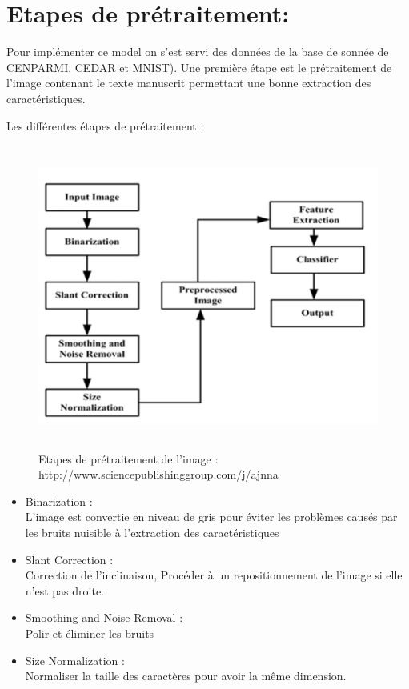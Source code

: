\documentclass[12pt, letterpaper]{article}
\begin{document}
\section{Etapes de prétraitement:} 
\par Pour implémenter ce model on s’est servi des données de la base de sonnée de CENPARMI, CEDAR et MNIST). Une première étape est le prétraitement de l’image contenant le texte manuscrit permettant une bonne extraction des caractéristiques. \\
\par Les différentes étapes de prétraitement :
\begin{figure}[H]
    \includegraphics[width=12cm,height=10cm]{images/pretraitement.png}
    \caption{Etapes de prétraitement de l’image : http://www.sciencepublishinggroup.com/j/ajnna}
    \label{fig:L1}
\end{figure}
\begin{itemize}
		\item Binarization :\\
		L’image est convertie en niveau de gris pour éviter les problèmes causés par les bruits nuisible à l’extraction des caractéristiques
		\item Slant Correction :\\
		Correction de l’inclinaison, Procéder à un repositionnement de l’image si elle n’est pas droite.
		\item Smoothing and Noise Removal : \\
		Polir et éliminer les bruits
		\item Size Normalization : \\
		Normaliser la taille des caractères pour avoir la même dimension.
\end{itemize}
\end{document}
